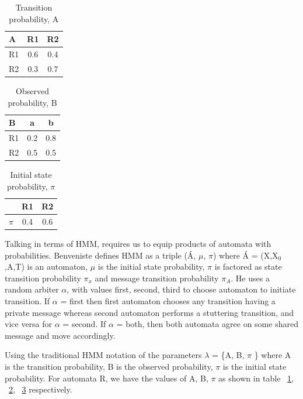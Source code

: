 \documentclass[letterpaper]{article}
\begin{document}
\begin{table}[h]
\centering
\begin{tabular}{ l | c | c }
 A & R1 & R2 \\
\hline
R1 & 0.6 & 0.4 \\
R2 & 0.3 & 0.7 \\
\end{tabular}
\caption{Transition probability, A}
\label{table:A}
\end{table}

\begin{table}[h]
\centering
\begin{tabular}{ l | c | c }
 B & a & b \\
\hline
R1 & 0.2 & 0.8 \\
R2 & 0.5 & 0.5 \\
\end{tabular}
\caption{Observed probability, B}
\label{table:B}
\end{table}

\begin{table}[h]
\centering
\begin{tabular}{ l | c | c }
&  R1 & R2 \\
\hline
$\pi$ & 0.4 & 0.6 \\

\end{tabular}
\caption{Initial state probability, $\pi$}
\label{table:pi}
\end{table}

Talking in terms of HMM, requires us to equip products of automata with probabilities. Benveniste defines HMM as a triple (\'{A}, $\mu$, $\pi$) where \'{A} = (X,X$_{0}$,A,T) is an automaton, $\mu$ is the initial state probability, $\pi$ is factored as state transition probability $\pi$$_{x}$ and message transition probability $\pi$$_{A}$. He uses a random arbiter $\alpha$, with values {first, second, third} to choose automaton to initiate transition. If $\alpha$ = first then first automaton chooses any transition having a private message whereas second automaton performs a stuttering transition, and vice versa for $\alpha$ = second. If $\alpha$ = both, then both automata agree on some shared message and move accordingly.

Using the traditional HMM notation of the parameters $\lambda$ = \{A, B, $\pi$ \} where A is the transition probability, B is the observed probability, $\pi$ is the initial state probability. For automata R, we have the values of A, B, $\pi$ as shown in table ~\ref{table:A}, ~\ref{table:B}, ~\ref{table:pi} respectively.
\end{document}
